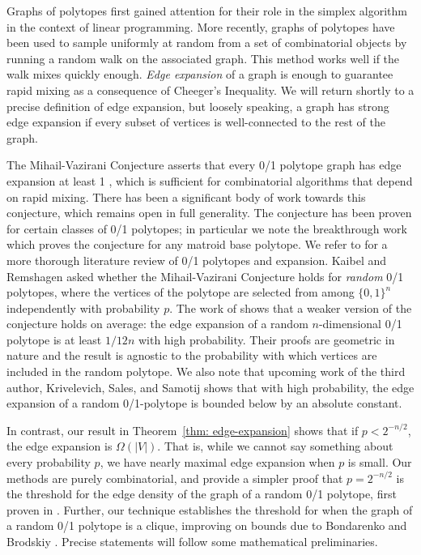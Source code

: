 \documentclass[11pt]{article}
\theoremstyle{definition}
\theoremstyle{plain}
\begin{document}
Graphs of polytopes first gained attention for their role in the simplex algorithm in the context of linear programming.
More recently, graphs of polytopes have been used to sample uniformly at random from a set of combinatorial objects by running a random walk on the associated graph.
This method works well if the walk mixes quickly enough. 
\emph{Edge expansion} of a graph is enough to guarantee rapid mixing as a consequence of Cheeger's Inequality. We will return shortly to a precise definition of edge expansion, but loosely speaking, a graph has strong edge expansion if every subset of vertices is well-connected to the rest of the graph. 

The Mihail-Vazirani Conjecture asserts that every 0/1 polytope graph has edge expansion at least 1 \cite{MihailVaziraniConj}, which is sufficient for combinatorial algorithms that depend on rapid mixing.
There has been a significant body of work towards this conjecture, which remains open in full generality. The conjecture has been proven for certain classes of 0/1 polytopes; in particular we note the breakthrough work \cite{logconcavepolynomials} which proves the conjecture for any matroid base polytope.
We refer to \cite[Section 3]{LerouxRademacherExpansion} for a more thorough literature review of 0/1 polytopes and expansion. Kaibel and Remshagen \cite{KaibelRemshagenDensity} asked whether the Mihail-Vazirani Conjecture holds for \emph{random} 0/1 polytopes, where the vertices of the polytope are selected from among $\{0,1\}^n$ independently with probability $p$. The work of \cite{LerouxRademacherExpansion} shows that a weaker version of the conjecture holds on average: the edge expansion of a random $n$-dimensional 0/1 polytope
is at least $1/12n$ with high probability. Their proofs are geometric in nature and the result is agnostic to the probability with which vertices are included in the random polytope.  We also note that upcoming work of the third author, Krivelevich, Sales, and Samotij shows that with high probability, the edge expansion of a random 0/1-polytope is bounded below by an absolute constant.


In contrast, our result in Theorem~\ref{thm: edge-expansion} shows that if $p < 2^{-n/2}$, the edge expansion is $\Omega(|V|)$. 
That is, while we cannot say something about every probability $p$, we have nearly maximal edge expansion when $p$ is small. 
Our methods are purely combinatorial, and provide a simpler proof that $p = 2^{-n/2}$ is the threshold for the edge density of the graph of a random 0/1 polytope, first proven in \cite{KaibelRemshagenDensity}. Further, our technique establishes the threshold for when the graph of a random 0/1 polytope is a clique, improving on bounds due to Bondarenko and Brodskiy \cite{BondarenkoBrodskiiCliques}. Precise statements will follow some mathematical preliminaries.
\end{document}
